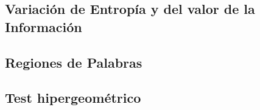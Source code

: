 \subsection{Variación de Entropía y del valor de la Información}

\subsection{Regiones de Palabras}

\subsection{Test hipergeométrico}